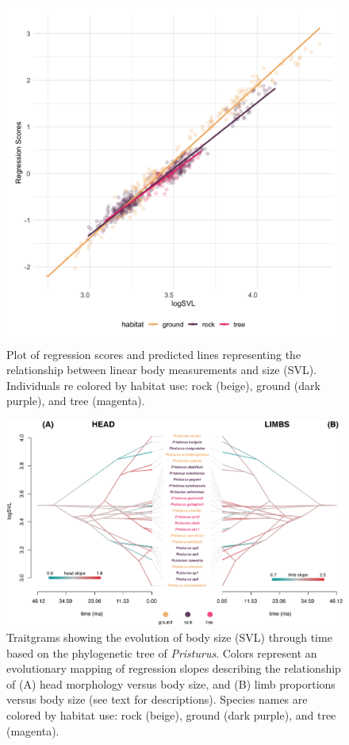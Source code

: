 \documentclass[
]{article}
\begin{document}
\begin{figure}
\includegraphics[width=1\linewidth]{Figs/figure_2_ggplot} \caption{Plot of regression scores and predicted lines representing the relationship between linear body measurements and size (SVL). Individuals re colored by habitat use: rock (beige), ground (dark purple), and tree (magenta).}\label{fig:unnamed-chunk-2}
\end{figure}

\newpage

\begin{figure}
\includegraphics[width=1\linewidth]{Figs/figure_phenograms} \caption{Traitgrams showing the evolution of body size (SVL) through time based on the phylogenetic tree of \textit{Pristurus}. Colors represent an evolutionary mapping of regression slopes describing the relationship of (A) head morphology versus body size, and (B) limb proportions versus body size (see text for descriptions). Species names are colored by habitat use: rock (beige), ground (dark purple), and tree (magenta).}\label{fig:unnamed-chunk-3}
\end{figure}
\end{document}
